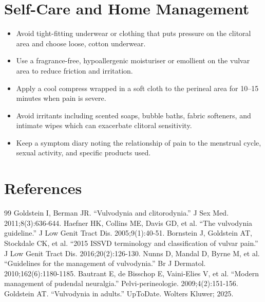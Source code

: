 \section*{Self-Care and Home Management}
\begin{itemize}
  \item Avoid tight-fitting underwear or clothing that puts pressure on the clitoral area and choose loose, cotton underwear.
  \item Use a fragrance-free, hypoallergenic moisturiser or emollient on the vulvar area to reduce friction and irritation.
  \item Apply a cool compress wrapped in a soft cloth to the perineal area for 10–15 minutes when pain is severe.
  \item Avoid irritants including scented soaps, bubble baths, fabric softeners, and intimate wipes which can exacerbate clitoral sensitivity.
  \item Keep a symptom diary noting the relationship of pain to the menstrual cycle, sexual activity, and specific products used.
\end{itemize}

\section*{References}
\begin{thebibliography}{99}
 Goldstein I, Berman JR. ``Vulvodynia and clitorodynia.'' J Sex Med. 2011;8(3):636-644.
 Haefner HK, Collins ME, Davis GD, et al. ``The vulvodynia guideline.'' J Low Genit Tract Dis. 2005;9(1):40-51.
 Bornstein J, Goldstein AT, Stockdale CK, et al. ``2015 ISSVD terminology and classification of vulvar pain.'' J Low Genit Tract Dis. 2016;20(2):126-130.
 Nunns D, Mandal D, Byrne M, et al. ``Guidelines for the management of vulvodynia.'' Br J Dermatol. 2010;162(6):1180-1185.
 Bautrant E, de Bisschop E, Vaini-Elies V, et al. ``Modern management of pudendal neuralgia.'' Pelvi-perineologie. 2009;4(2):151-156.
 Goldstein AT. ``Vulvodynia in adults.'' UpToDate. Wolters Kluwer; 2025.
\end{thebibliography}

